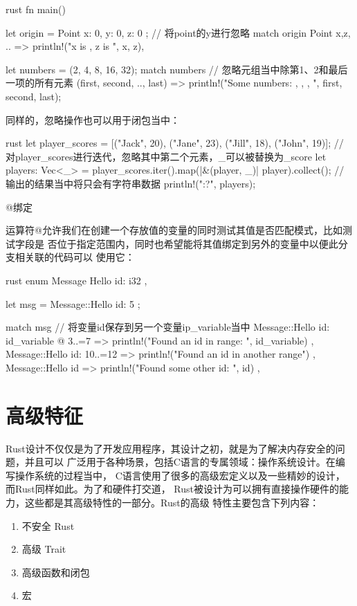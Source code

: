 \begin{outline}[enumerate]
\begin{code-in-enumerate}{rust}
fn main() {
    let origin = Point { x: 0, y: 0, z: 0 };
    // 将point的y进行忽略
    match origin {
        Point { x,z, .. } => println!("x is {}, z is {}", x, z),
    }

    let numbers = (2, 4, 8, 16, 32);
    match numbers {
        // 忽略元组当中除第1、2和最后一项的所有元素
        (first, second, .., last) => {
            println!("Some numbers: {}, {}, {}, ", first, second, last);
        }
    }
}
\end{code-in-enumerate}

同样的，忽略操作也可以用于闭包当中：
\begin{code-in-enumerate}{rust}
let player_scores = [("Jack", 20), ("Jane", 23), ("Jill", 18), ("John", 19)];
// 对player_scores进行迭代，忽略其中第二个元素，_可以被替换为_score
let players: Vec<_> = player_scores.iter().map(|&(player, _)| player).collect();
// 输出的结果当中将只会有字符串数据
println!("{:?}", players);
\end{code-in-enumerate}


\1 @绑定

运算符@允许我们在创建一个存放值的变量的同时测试其值是否匹配模式，比如测试字段是
否位于指定范围内，同时也希望能将其值绑定到另外的变量中以便此分支相关联的代码可以
使用它：
\begin{code-in-enumerate}{rust}
enum Message {
    Hello { id: i32 },
}

let msg = Message::Hello { id: 5 };

match msg {
    // 将变量id保存到另一个变量ip_variable当中
    Message::Hello { id: id_variable @ 3..=7 } => {
        println!("Found an id in range: {}", id_variable)
    },
    Message::Hello { id: 10..=12 } => {
        println!("Found an id in another range")
    },
    Message::Hello { id } => {
        println!("Found some other id: {}", id)
    },
}
\end{code-in-enumerate}
\end{outline}

\section{高级特征}
Rust设计不仅仅是为了开发应用程序，其设计之初，就是为了解决内存安全的问题，并且可以
广泛用于各种场景，包括C语言的专属领域：操作系统设计。在编写操作系统的过程当中，
C语言使用了很多的高级宏定义以及一些精妙的设计，而Rust同样如此。为了和硬件打交道，
Rust被设计为可以拥有直接操作硬件的能力，这些都是其高级特性的一部分。Rust的高级
特性主要包含下列内容：
\begin{enumerate}
  \item 不安全 Rust
  \item 高级 Trait
  \item 高级函数和闭包
  \item 宏
\end{enumerate}

